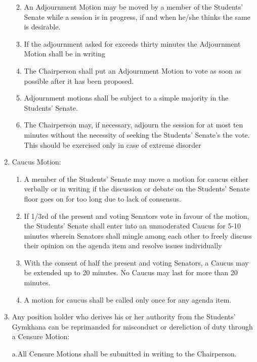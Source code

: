 \begin{enumerate}
  \begin{enumerate}
  \def\labelenumii{\alph{enumii}.}
  \item
    An Adjournment Motion may be moved by a member of the Students'
    Senate while a session is in progress, if and when he/she thinks the
    same is desirable.
  \item
    If the adjournment asked for exceeds thirty minutes the Adjournment
    Motion shall be in writing
  \item
    The Chairperson shall put an Adjournment Motion to vote as soon as
    possible after it has been proposed.
  \item
    Adjournment motions shall be subject to a simple majority in the
    Students' Senate.
  \item
    The Chairperson may, if necessary, adjourn the session for at most
    ten minutes without the necessity of seeking the Students' Senate's
    the vote. This should be exercised only in case of extreme disorder
  \end{enumerate}
\item
  Caucus Motion:

  \begin{enumerate}
  \def\labelenumii{\alph{enumii}.}
  \item
    A member of the Students' Senate may move a motion for caucus either
    verbally or in writing if the discussion or debate on the Students'
    Senate floor goes on for too long due to lack of consensus.
  \item
    If 1/3rd of the present and voting Senators vote in favour of the
    motion, the Students' Senate shall enter into an unmoderated Caucus
    for 5-10 minutes wherein Senators shall mingle among each other to
    freely discuss their opinion on the agenda item and resolve issues
    individually
  \item
    With the consent of half the present and voting Senators, a Caucus
    may be extended up to 20 minutes. No Caucus may last for more than
    20 minutes.
  \item
    A motion for caucus shall be called only once for any agenda item.
  \end{enumerate}
\item
  Any position holder who derives his or her authority from the
  Students' Gymkhana can be reprimanded for misconduct or dereliction of
  duty through a Censure Motion:

  a.All Censure Motions shall be submitted in writing to the
  Chairperson.


\end{enumerate}

